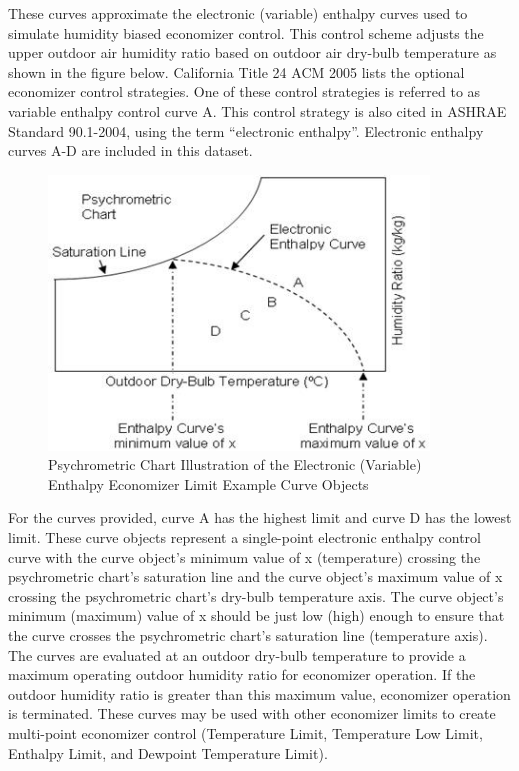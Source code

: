 These curves approximate the electronic (variable) enthalpy curves used to simulate humidity biased economizer control. This control scheme adjusts the upper outdoor air humidity ratio based on outdoor air dry-bulb temperature as shown in the figure below. California Title 24 ACM 2005 lists the optional economizer control strategies. One of these control strategies is referred to as variable enthalpy control curve A. This control strategy is also cited in ASHRAE Standard 90.1-2004, using the term ``electronic enthalpy''. Electronic enthalpy curves A-D are included in this dataset.

\begin{figure}[hbtp] %
\centering
\includegraphics[width=0.9\textwidth, height=0.9\textheight, keepaspectratio=true]{media/image027.jpg}
\caption{Psychrometric Chart Illustration of the Electronic (Variable) Enthalpy Economizer Limit Example Curve Objects \protect \label{fig:psychrometric-chart-illustration-of}}
\end{figure}

For the curves provided, curve A has the highest limit and curve D has the lowest limit. These curve objects represent a single-point electronic enthalpy control curve with the curve object's minimum value of x (temperature) crossing the psychrometric chart's saturation line and the curve object's maximum value of x crossing the psychrometric chart's dry-bulb temperature axis. The curve object's minimum (maximum) value of x should be just low (high) enough to ensure that the curve crosses the psychrometric chart's saturation line (temperature axis). The curves are evaluated at an outdoor dry-bulb temperature to provide a maximum operating outdoor humidity ratio for economizer operation. If the outdoor humidity ratio is greater than this maximum value, economizer operation is terminated. These curves may be used with other economizer limits to create multi-point economizer control (Temperature Limit, Temperature Low Limit, Enthalpy Limit, and Dewpoint Temperature Limit).

